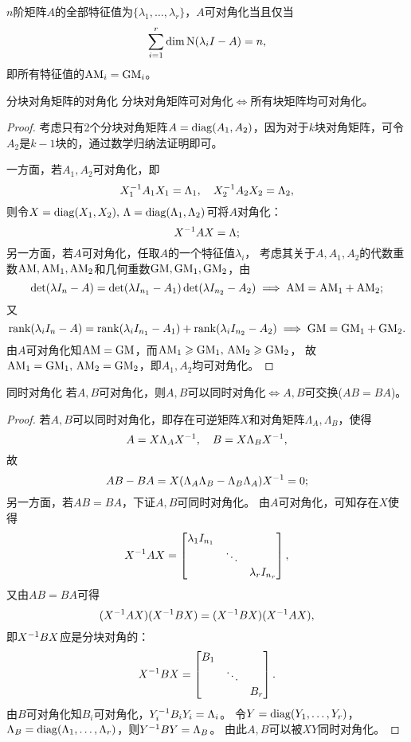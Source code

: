 \begin{corollary}
	$n$阶矩阵$A$的全部特征值为$\{\lambda_1,\ldots,\lambda_r\}$，$A$可对角化当且仅当
	\[
		\sum_{i=1}^r\dim\operatorname{N}(\lambda_iI-A)=n,
	\]
	即所有特征值的$\mathrm{AM}_i=\mathrm{GM}_i$。
\end{corollary}

\begin{theorem}
	{分块对角矩阵的对角化}{}
	分块对角矩阵可对角化$\iff$所有块矩阵均可对角化。
\end{theorem}

\begin{proof}
	考虑只有2个分块对角矩阵$A=\operatorname{diag}(A_1,A_2)$，因为对于$k$块对角矩阵，可令$A_2$是$k-1$块的，通过数学归纳法证明即可。

	一方面，若$A_1,A_2$可对角化，即
	\[
		X_1^{-1} A_1X_1=\Lambda_1,\quad X_2^{-1} A_2X_2=\Lambda_2,
	\]
	则令$X=\operatorname{diag}(X_1,X_2),\,\Lambda=\operatorname{diag}(\Lambda_1,\Lambda_2)$可将$A$对角化：
	\[
		X^{-1} AX=\Lambda;
	\]
	另一方面，若$A$可对角化，任取$A$的一个特征值$\lambda_i$，
	考虑其关于$A,A_1,A_2$的代数重数$\mathrm{AM},\mathrm{AM}_1,\mathrm{AM}_2$和几何重数$\mathrm{GM},\mathrm{GM}_1,\mathrm{GM}_2$，由
	\[
		\det(\lambda I_n-A)=\det(\lambda I_{n_1}-A_1)\det(\lambda I_{n_2}-A_2)\implies\mathrm{AM}=\mathrm{AM}_1+\mathrm{AM}_2;
	\]
	又
	\[
		\operatorname{rank}(\lambda_iI_n-A)=\operatorname{rank}(\lambda_iI_{n_1}-A_1)+\operatorname{rank}(\lambda_iI_{n_2}-A_2)\implies\mathrm{GM}=\mathrm{GM}_1+\mathrm{GM}_2.
	\]
	由$A$可对角化知$\mathrm{AM}=\mathrm{GM}$，而$\mathrm{AM}_1\geqslant\mathrm{GM}_1,\,\mathrm{AM}_2\geqslant\mathrm{GM}_2$，
	故$\mathrm{AM}_1=\mathrm{GM}_1,\,\mathrm{AM}_2=\mathrm{GM}_2$，即$A_1,A_2$均可对角化。
\end{proof}

\begin{theorem}{同时对角化}{}
	若$A,B$可对角化，则$A,B$可以同时对角化$\iff A,B$可交换($AB=BA$)。
\end{theorem}

\begin{proof}
	若$A,B$可以同时对角化，即存在可逆矩阵$X$和对角矩阵$\Lambda_A,\Lambda_B$，使得
	\[
		A=X\Lambda_AX^{-1},\quad B=X\Lambda_BX^{-1},
	\]
	故
	\[
		AB-BA=X(\Lambda_A\Lambda_B-\Lambda_B\Lambda_A)X^{-1}=0;
	\]
	另一方面，若$AB=BA$，下证$A,B$可同时对角化。
	由$A$可对角化，可知存在$X$使得
	\[
		X^{-1} AX=\begin{bmatrix}
			\lambda_1I_{n_1}\\ &\ddots\\ &&\lambda_rI_{n_r}
		\end{bmatrix},
	\]
	又由$AB=BA$可得
	\[
		(X^{-1} AX)(X^{-1} BX)=(X^{-1} BX)(X^{-1} AX),
	\]
	即$X^{-1} BX$应是分块对角的：
	\[
		X^{-1} BX=\begin{bmatrix}
			B_1\\ &\ddots\\ &&B_r
		\end{bmatrix}.
	\]
	由$B$可对角化知$B_i$可对角化，$Y_i^{-1} B_iY_i=\Lambda_i$。
	令$Y=\operatorname{diag}(Y_1,\ldots,Y_r)$，$\Lambda_B=\operatorname{diag}(\Lambda_1,\ldots,\Lambda_r)$，则$Y^{-1} BY=\Lambda_B$。
	由此$A,B$可以被$XY$同时对角化。
\end{proof}

